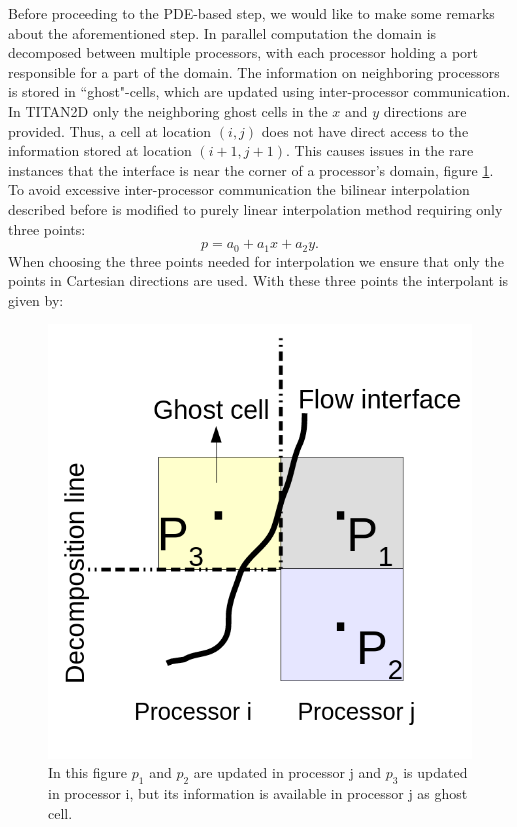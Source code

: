 \documentclass[review]{elsarticle}
\begin{document}
Before proceeding to the PDE-based step, we would like to make some remarks about the aforementioned step. 
In parallel computation the domain is decomposed between multiple processors, with each processor holding a port responsible for a part of the domain. 
The information on neighboring processors is stored in ``ghost"-cells, which are updated using inter-processor communication. In TITAN2D only the neighboring ghost
cells in the $x$ and $y$ directions are provided. Thus, a cell at location $(i,j)$ does not have direct access to the information stored at location $(i+1, j+1)$. 
This causes issues in the rare instances that the interface is near the corner of a processor's domain, figure \ref{fig:surf_interp}. To avoid 
excessive inter-processor communication the bilinear interpolation described before is modified to purely linear interpolation method requiring 
only three points:
\begin{equation}
\label{Surface}
p=a_0+a_1 x+a_2 y.
\end{equation} 
When choosing the three points needed for interpolation we ensure that only the points in Cartesian directions are used.
With these three points the interpolant is given by:
\begin{figure}[ht]
\centering
\includegraphics[scale=.25]{IMAGES/surf_interp.png}
\caption{In this figure $p_1$ and $p_2$ are updated in processor j and $p_3$ is updated in processor i, but its information is available in processor j as ghost cell. }
                \label{fig:surf_interp}
\end{figure}
\end{document}
